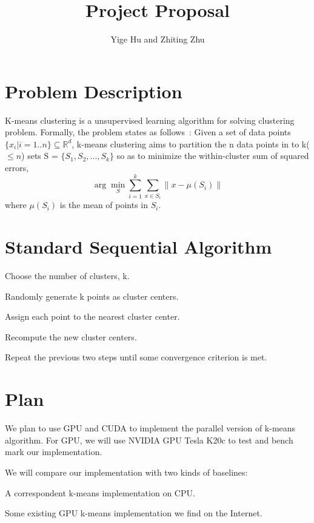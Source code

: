 \documentclass{article}
\begin{document}
\title{Project Proposal}
\author{Yige Hu and Zhiting Zhu}
\date{}
\maketitle

\section{Problem Description}
K-means clustering is a unsupervised learning algorithm for solving clustering
problem. Formally, the problem states
as follows~\cite{wiki}: Given a set of data points $\{x_i|i = 1..n\} \subseteq \mathbb{R}^d $, k-means clustering aims to partition the n data points
in to k($\leq n$) sets S = $\{S_1, S_2, ..., S_k\}$ so as to minimize
the within-cluster sum of squared
errors, $$\arg\min_{S}\sum_{i=1}^{k}\sum_{x \in S_i} \parallel x -
\mu(S_i)\parallel$$ where $\mu(S_i)$ is the mean of points in $S_i$. 

\section{Standard Sequential Algorithm}
\begin{compactitem}
\item{Choose the number of clusters, k.}
\item{Randomly generate k points as cluster centers.}
\item{Assign each point to the nearest cluster center.}
\item{Recompute the new cluster centers.}
\item{Repeat the previous two steps until some convergence criterion
  is met.}
\end{compactitem}

\section{Plan}
We plan to use GPU and CUDA to implement the parallel version of
k-means algorithm. For GPU, we will use NVIDIA GPU Tesla K20c to test
and bench mark our implementation. 

We will compare our implementation with two kinds of baselines:
\begin{compactitem}
\item{A correspondent k-means implementation on CPU.}
\item{Some existing GPU k-means implementation we find on the Internet\cite{serban-kmeans, gpuminer}.
}
\end{compactitem}



  
\end{document}
